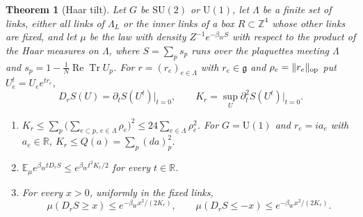 \documentclass[11pt]{amsart}
\newtheorem{theorem}{Theorem}[section]
\theoremstyle{definition}
\theoremstyle{remark}
\numberwithin{equation}{section}
\newcommand{\R}{\mathbb{R}}
\newcommand{\Z}{\mathbb{Z}}
\newcommand{\E}{\mathbb{E}}
\newcommand{\SU}{\mathrm{SU}}
\newcommand{\U}{\mathrm{U}}
\newcommand{\g}{\mathfrak{g}}
\newcommand{\ReTr}{\operatorname{Re}\operatorname{Tr}}
\begin{document}
\begin{theorem}[Haar tilt]\label{thm:haartilt}
Let $G$ be $\SU(2)$ or $\U(1)$, let $\Lambda$ be a finite set of links,
either all links of $\Lambda_L$ or the inner links of a box $R\subset\Z^4$
whose other links are fixed, and let $\mu$ be the law with density
$Z^{-1}e^{-\beta_WS}$ with respect to the product of the Haar measures on
$\Lambda$, where $S=\sum_ps_p$ runs over the plaquettes meeting $\Lambda$
and $s_p=1-\frac1N\ReTr U_p$. For $r=(r_e)_{e\in\Lambda}$ with $r_e\in\g$
and $\rho_e=\|r_e\|_{\rm op}$ put $U^t_e=U_ee^{tr_e}$,
\[
D_rS(U)=\partial_tS(U^t)\big|_{t=0},\qquad K_r=\sup_U\partial_t^2S(U^t)
\big|_{t=0}.
\]
\begin{enumerate}[label=\textup{(\roman*)},leftmargin=*]
\item $K_r\le\sum_p\bigl(\sum_{e\subset p,\,e\in\Lambda}\rho_e\bigr)^2\le
24\sum_{e\in\Lambda}\rho_e^2$. For $G=\U(1)$ and $r_e=ia_e$ with $a_e\in\R$,
$K_r\le Q(a)=\sum_p(da)_p^2$.
\item $\E_\mu e^{\beta_WtD_rS}\le e^{\beta_Wt^2K_r/2}$ for every $t\in\R$.
\item For every $x>0$, uniformly in the fixed links,
\[
\mu(D_rS\ge x)\le e^{-\beta_Wx^2/(2K_r)},\qquad\mu(D_rS\le-x)\le
e^{-\beta_Wx^2/(2K_r)}.
\]
\end{enumerate}
\end{theorem}
\end{document}
